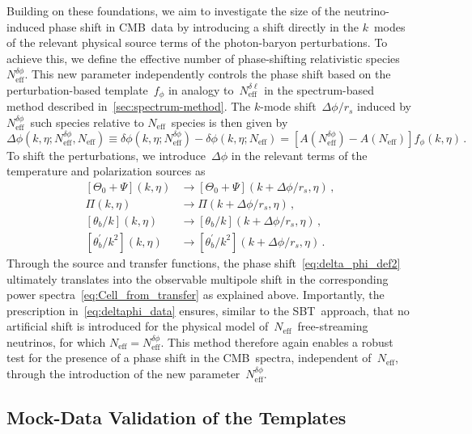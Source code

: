 \documentclass[11pt]{article}
\numberwithin{equation}{section}
\newcommand{\Neff}{N_\mathrm{eff}}
\newcommand{\Nphase}{N_\mathrm{eff}^{\delta\phi}}
\newcommand{\Nmultipole}{N_\mathrm{eff}^{\delta\ell}}
\begin{document}
Building on these foundations, we aim to investigate the size of the neutrino-induced phase shift in CMB~data by introducing a shift directly in the $k$~modes of the relevant physical source terms of the photon-baryon perturbations. To achieve this, we define the effective number of phase-shifting relativistic species~$\Nphase$. This new parameter independently controls the phase shift based on the perturbation-based template~$f_\phi$ in analogy to~$\Nmultipole$ in the spectrum-based method described in~\textsection\ref{sec:spectrum-method}. The $k$-mode shift~$\Delta\phi/r_s$ induced by $\Nphase$~such species relative to $\Neff$~species is then given by
\begin{equation}
	\Delta\phi(k, \eta; \Nphase, \Neff) \equiv \delta\phi(k, \eta; \Nphase) - \delta\phi(k, \eta; \Neff) = \left[A(\Nphase) - A(\Neff)\right] f_\phi(k, \eta)\, . \label{eq:delta_phi_def2}
\end{equation}
To shift the perturbations, we introduce~$\Delta\phi$ in the relevant terms of the temperature and polarization sources as
\begin{equation}
	\begin{split}
		\left[\Theta_0 + \Psi\right]\!(k, \eta) 	&\rightarrow \left[\Theta_0 + \Psi\right]\!(k + \Delta\phi/r_s, \eta)\, ,	\\
		\Pi(k, \eta) 								&\rightarrow \Pi(k + \Delta\phi/r_s, \eta)\, ,								\\
		\left[\theta_b/k\right]\!(k, \eta) 			&\rightarrow \left[\theta_b/k\right]\!(k + \Delta\phi/r_s, \eta)\, ,		\\
		\left[\theta^\prime_b/k^2\right]\!(k, \eta) &\rightarrow \left[\theta^\prime_b/k^2\right]\!(k + \Delta\phi/r_s,\eta)\, .	
	\end{split}	\label{eq:deltaphi_data}
\end{equation}
Through the source and transfer functions, the phase shift~\eqref{eq:delta_phi_def2} ultimately translates into the observable multipole shift in the corresponding power spectra~\eqref{eq:Cell_from_transfer} as explained above. Importantly, the prescription in~\eqref{eq:deltaphi_data} ensures, similar to the SBT~approach, that no artificial shift is introduced for the physical model of~$\Neff$~free-streaming neutrinos, for which $\Neff = \Nphase$. This method therefore again enables a robust test for the presence of a phase shift in the CMB~spectra, independent of~$\Neff$, through the introduction of the new parameter~$\Nphase$.


\subsection{Mock-Data Validation of the Templates}
\label{sec:validation_comparison}
\end{document}
